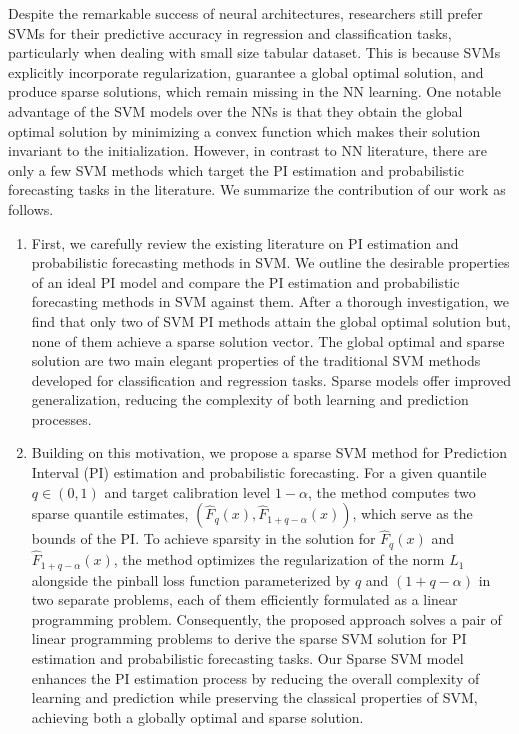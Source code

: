 \documentclass[10pt]{article} %
\begin{document}
Despite the remarkable success of neural architectures, researchers still prefer SVMs for their predictive accuracy in regression and classification tasks, particularly when dealing with small size tabular dataset. This is because SVMs explicitly incorporate regularization, guarantee a global optimal solution, and produce sparse solutions, which remain missing in the NN learning. One notable advantage of the SVM models over the NNs is that they obtain the global optimal solution by minimizing a convex function which makes their solution invariant to the initialization. However, in contrast to NN literature, there are only a few SVM methods which target the PI estimation and probabilistic forecasting tasks in the literature. We summarize the contribution of our work as follows. 
\begin{enumerate}
    \item [(a)] First, we carefully review the existing literature on PI estimation and probabilistic forecasting methods in SVM. We outline the desirable properties of an ideal PI model and compare the PI estimation and probabilistic forecasting methods in SVM against them.  After a thorough investigation, we find that only two of SVM PI methods attain the global optimal solution but, none of them achieve a sparse solution vector.  The global optimal and sparse solution are  two  main elegant properties of the  traditional SVM methods developed for classification and regression tasks. Sparse models offer improved generalization, reducing the complexity of both learning and prediction processes.

    \item[(b)] Building on this motivation, we propose a sparse SVM method for Prediction Interval (PI) estimation and probabilistic forecasting. For a given quantile $q \in (0,1)$ and target calibration level $1-\alpha$, the method computes two sparse quantile estimates, $(\hat{F}_{q}(x), \hat{F}_{1+q-\alpha}(x))$, which serve as the bounds of the PI. To achieve sparsity in the solution for $\hat{F}_{q}(x)$ and $\hat{F}_{1+q-\alpha}(x)$, the method optimizes the regularization of the norm $L_1$ alongside the pinball loss function parameterized by $q$ and $(1+q-\alpha)$ in two separate problems, each of them efficiently formulated as a linear programming problem. Consequently, the proposed approach solves a pair of linear programming problems to derive the sparse SVM solution for PI estimation and probabilistic forecasting tasks. Our Sparse SVM model enhances the PI estimation process by reducing the overall complexity of learning and prediction while preserving the classical properties of SVM, achieving both a globally optimal and sparse solution.
    

\end{enumerate}
\end{document}

